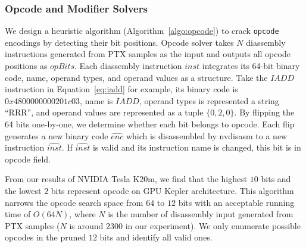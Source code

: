 \subsubsection{Opcode and Modifier Solvers}
We design a heuristic algorithm (Algorithm~\ref{algo:opcode}) to crack {\tt opcode} encodings by detecting their bit positions.
Opcode solver takes $N$ diassembly instructions generated from PTX samples as the input and outputs all opcode positions as $opBits$.
Each diassembly instruction $inst$ integrates its 64-bit binary code, name, operand types, and operand values as a structure.
Take the $IADD$ instruction in Equation~\ref{eq:iadd} for example, its binary code is $0x4800000000201c03$, name is $IADD$, operand types is represented a string ``RRR'', and operand values are represented as a tuple $\{ 0,2,0 \}$.
By flipping the 64 bits one-by-one, we determine whether each bit belongs to opcode.
Each flip generates a new binary code $\widehat{enc}$ which is disassembled by nvdisasm to a new instruction $\widehat{inst}$.
If $\widehat{inst}$ is valid and its instruction name is changed, this bit is in opcode field.


From our results of NVIDIA Tesla K20m, we find that the highest $10$ bits and the lowest $2$ bits represent opcode on GPU Kepler architecture.
This algorithm narrows the opcode search space from $64$ to $12$ bits with an acceptable running time of $O(64N)$, where $N$ is the number of disassembly input generated from PTX samples ($N$ is around $2300$ in our experiment). %
We only enumerate possible opcodes in the pruned $12$ bits and identify all valid ones.


